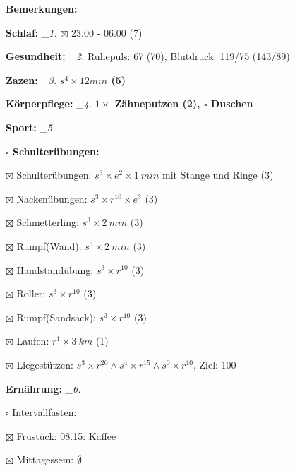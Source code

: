 \documentclass[10pt,a4paper]{article}
\newcommand\prop[1] {{\color {alizarin} {\bf #1}}}        %
\newcommand\draf[1] {{\color {amber(sae/ece)} {\bf #1}}}  %
\newcommand\mand[1] {{\color {burntorange} {\bf #1}}}     %
\newcommand\topspace{\vskip -15pt \hskip 20pt}
\newcommand\bottomspace{\vskip 4pt}
\newcommand\n[1] { {\sl #1.} \hskip 5pt }
\begin{document}
\begin{mdframed}[style=daystyle]
  \begin{labeling}{{\mand {Bemerkungen:}}}
    \setlength\itemsep{-3pt}
  \item[{\mand {Schlaf:}}]        \n{\_1} $\boxtimes$ 23.00 - 06.00 (7)
  \item[{\mand {Gesundheit:}}]    \n{\_2} Ruhepuls: 67 (70), Blutdruck: 119/75 (143/89)
  \item[{\mand {Zazen:}}]         \n{\_3} {\draf {$s^4 \times 12 min$ (5)}}
  \item[{\mand {Körperpflege:}}]  \n{\_4} {\draf {$1 \times$ Zähneputzen (2), $\square$ Duschen}}
  \item[{\mand {Sport:}}]         \n{\_5}
    \topspace
    \begin{minipage}{0.75\textwidth}  
      \begin{labeling}{\prop {$\square$ {Schulterübungen:}}} 
        \setlength\itemsep{-3pt}
      \item[$\boxtimes$ Schulterübungen:] $s^3 \times e^2 \times 1\ min$ mit Stange und Ringe (3)
      \item[$\boxtimes$ Nackenübungen:]   $s^3 \times r^{10} \times e^3$ (3)
      \item[$\boxtimes$ Schmetterling:]   $s^3 \times 2\ min$ (3)
      \item[$\boxtimes$ Rumpf(Wand):]     $s^3 \times 2\ min$ (3)
      \item[$\boxtimes$ Handstandübung:]  $s^3 \times r^{10}$ (3)
      \item[$\boxtimes$ Roller:]          $s^3 \times r^{10}$ (3)
      \item[$\boxtimes$ Rumpf(Sandsack):] $s^3 \times r^{10}$ (3)
      \item[$\boxtimes$ Laufen:]          $r^1 \times 3\ km$ (1)
      \item[$\boxtimes$ Liegestützen:]    $s^3 \times r^{20} \land s^4 \times r^{15} \land s^0 \times r^{10}$, Ziel: 100
      \end{labeling}
    \end{minipage}
    \bottomspace        
  \item[{\mand {Ernährung:}}]     \n{\_6}
    \topspace
    \begin{minipage}{0.75\textwidth}  
      \begin{labeling}{$\square$ Intervallfasten:} 
        \setlength\itemsep{-3pt}  
      \item[$\boxtimes$ Früstück:]         08.15: Kaffee
      \item[$\boxtimes$ Mittagessem:]      $\emptyset$

\end{labeling}
\end{minipage}
\end{labeling}
\end{mdframed}
\end{document}
